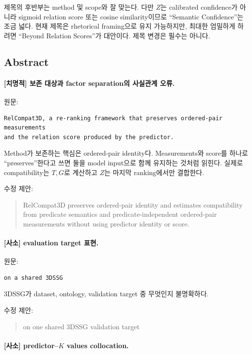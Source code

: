 \documentclass[11pt]{article}
\newcommand{\fatal}{\textbf{\textcolor{fatalred}{[치명적]}}}
\newcommand{\minor}{\textbf{\textcolor{minorblue}{[사소]}}}
\begin{document}
제목의 후반부는 method 및 scope와 잘 맞는다. 다만 $Z$는 calibrated confidence가
아니라 sigmoid relation score 또는 cosine similarity이므로 ``Semantic Confidence''는
조금 넓다. 현재 제목은 rhetorical framing으로 유지 가능하지만, 최대한 엄밀하게 하려면
``Beyond Relation Scores''가 대안이다. 제목 변경은 필수는 아니다.

\subsection{Abstract}

\paragraph{\fatal{} 보존 대상과 factor separation의 사실관계 오류.}

원문:
\begin{verbatim}
RelCompat3D, a re-ranking framework that preserves ordered-pair measurements
and the relation score produced by the predictor.
\end{verbatim}

Method가 보존하는 핵심은 ordered-pair identity다. Measurements와 score를 하나로
``preserves''한다고 쓰면 둘을 model input으로 함께 유지하는 것처럼 읽힌다. 실제로
compatibility는 $T,G$로 계산하고 $Z$는 마지막 ranking에서만 결합한다.

수정 제안:
\begin{quote}
RelCompat3D preserves ordered-pair identity and estimates compatibility from
predicate semantics and predicate-independent ordered-pair measurements without
using predictor identity or score.
\end{quote}

\paragraph{\minor{} evaluation target 표현.}

원문:
\begin{verbatim}
on a shared 3DSSG
\end{verbatim}

3DSSG가 dataset, ontology, validation target 중 무엇인지 불명확하다.

수정 제안:
\begin{quote}
on one shared 3DSSG validation target
\end{quote}

\paragraph{\minor{} predictor--$K$ values collocation.}
\end{document}
